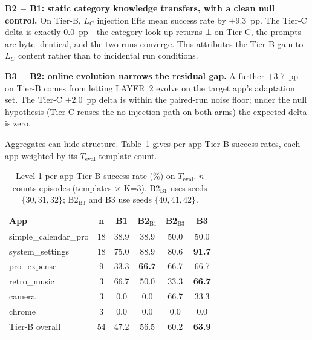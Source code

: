 \textbf{B2 $-$ B1: static category knowledge transfers, with a clean null
control.} On Tier-B, $L_C$ injection lifts mean success rate by $+9.3$~pp. The
Tier-C delta is exactly $0.0$~pp---the category look-up returns $\bot$ on
Tier-C, the prompts are byte-identical, and the two runs converge. This
attributes the Tier-B gain to $L_C$ content rather than to incidental run
conditions.

\textbf{B3 $-$ B2: online evolution narrows the residual gap.} A further
$+3.7$~pp on Tier-B comes from letting LAYER~2 evolve on the target app's
adaptation set. The Tier-C $+2.0$~pp delta is within the paired-run noise floor;
under the null hypothesis (Tier-C reuses the no-injection path on both arms) the
expected delta is zero.

Aggregates can hide structure. Table~\ref{tab:aw-perapp} gives per-app Tier-B
success rates, each app weighted by its $T_{\text{eval}}$ template count.

\begin{table}[t]
\small
\centering
\begin{tabular}{l@{\,}c@{\,}c@{\,}c@{\,}c@{\,}c}
\hline
\textbf{App}             & \textbf{n} & \textbf{B1} & \textbf{B2$_{\text{B1}}$} & \textbf{B2$_{\text{B3}}$} & \textbf{B3} \\
\hline
simple\_calendar\_pro    & 18 & 38.9 & 38.9 & 50.0 & 50.0 \\
system\_settings         & 18 & 75.0 & 88.9 & 80.6 & \textbf{91.7} \\
pro\_expense             &  9 & 33.3 & \textbf{66.7} & 66.7 & 66.7 \\
retro\_music             &  3 & 66.7 & 50.0 & 33.3 & \textbf{66.7} \\
camera                   &  3 &  0.0 &  0.0 & 66.7 & 33.3 \\
chrome                   &  3 &  0.0 &  0.0 &  0.0 &  0.0 \\
\hline
Tier-B overall           & 54 & 47.2 & 56.5 & 60.2 & \textbf{63.9} \\
\hline
\end{tabular}
\caption{Level-1 per-app Tier-B success rate (\%) on $T_{\text{eval}}$. $n$
counts episodes (templates $\times$ K=3). B2$_{\text{B1}}$ uses seeds
$\{30,31,32\}$; B2$_{\text{B3}}$ and B3 use seeds $\{40,41,42\}$.}
\label{tab:aw-perapp}
\end{table}

